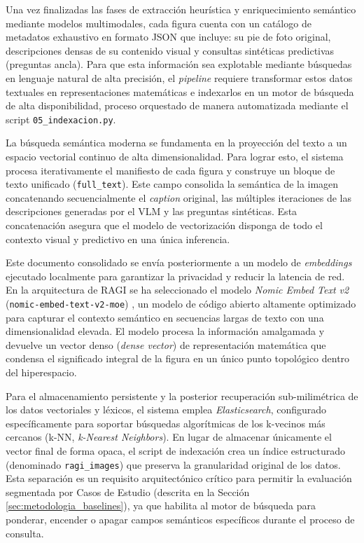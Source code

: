 \documentclass[a4paper]{report}
\begin{document}
Una vez finalizadas las fases de extracción heurística y enriquecimiento semántico mediante modelos multimodales, cada figura cuenta con un catálogo de metadatos exhaustivo en formato JSON que incluye: su pie de foto original, descripciones densas de su contenido visual y consultas sintéticas predictivas (preguntas ancla). Para que esta información sea explotable mediante búsquedas en lenguaje natural de alta precisión, el \textit{pipeline} requiere transformar estos datos textuales en representaciones matemáticas e indexarlos en un motor de búsqueda de alta disponibilidad, proceso orquestado de manera automatizada mediante el script \texttt{05\_indexacion.py}.

La búsqueda semántica moderna se fundamenta en la proyección del texto a un espacio vectorial continuo de alta dimensionalidad. Para lograr esto, el sistema procesa iterativamente el manifiesto de cada figura y construye un bloque de texto unificado (\texttt{full\_text}). Este campo consolida la semántica de la imagen concatenando secuencialmente el \textit{caption} original, las múltiples iteraciones de las descripciones generadas por el VLM y las preguntas sintéticas. Esta concatenación asegura que el modelo de vectorización disponga de todo el contexto visual y predictivo en una única inferencia. 

Este documento consolidado se envía posteriormente a un modelo de \textit{embeddings} ejecutado localmente para garantizar la privacidad y reducir la latencia de red. En la arquitectura de RAGI se ha seleccionado el modelo \textit{Nomic Embed Text v2} (\texttt{nomic-embed-text-v2-moe}) \cite{nussbaum2024nomic}, un modelo de código abierto altamente optimizado para capturar el contexto semántico en secuencias largas de texto con una dimensionalidad elevada. El modelo procesa la información amalgamada y devuelve un vector denso (\textit{dense vector}) de representación matemática que condensa el significado integral de la figura en un único punto topológico dentro del hiperespacio.

Para el almacenamiento persistente y la posterior recuperación sub-milimétrica de los datos vectoriales y léxicos, el sistema emplea \textit{Elasticsearch}, configurado específicamente para soportar búsquedas algorítmicas de los k-vecinos más cercanos (k-NN, \textit{k-Nearest Neighbors}). En lugar de almacenar únicamente el vector final de forma opaca, el script de indexación crea un índice estructurado (denominado \texttt{ragi\_images}) que preserva la granularidad original de los datos. Esta separación es un requisito arquitectónico crítico para permitir la evaluación segmentada por Casos de Estudio (descrita en la Sección \ref{sec:metodologia_baselines}), ya que habilita al motor de búsqueda para ponderar, encender o apagar campos semánticos específicos durante el proceso de consulta. 
\end{document}
